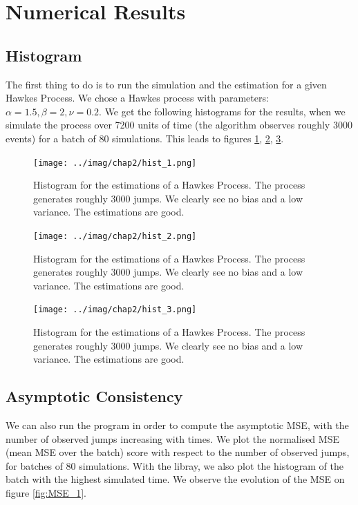 \documentclass[11pt]{book}
\begin{document}
\section{Numerical Results}


\subsection{Histogram}
The first thing to do is to run the simulation and the estimation for a given Hawkes Process. We chose a Hawkes process with parameters: $\alpha = 1.5, \beta = 2, \nu = 0.2$. We get the following histograms for the results, when we simulate the process over 7200 units of time (the algorithm observes roughly 3000 events) for a batch of 80 simulations. This leads to figures \ref{fig:hist_1_alpha}, \ref{fig:hist_1_beta}, \ref{fig:hist_1_nu}.

\begin{figure}
\centering
\texttt{[image: ../imag/chap2/hist\_1.png]}
\caption{Histogram for the estimations of a Hawkes Process. The process generates roughly 3000 jumps. We clearly see no bias and a low variance. The estimations are good.}
\label{fig:hist_1_alpha}
\end{figure}


\begin{figure}
\centering
\texttt{[image: ../imag/chap2/hist\_2.png]}
\caption{Histogram for the estimations of a Hawkes Process. The process generates roughly 3000 jumps. We clearly see no bias and a low variance. The estimations are good.}
\label{fig:hist_1_beta}
\end{figure}


\begin{figure}
\centering
\texttt{[image: ../imag/chap2/hist\_3.png]}
\caption{Histogram for the estimations of a Hawkes Process. The process generates roughly 3000 jumps. We clearly see no bias and a low variance. The estimations are good.}
\label{fig:hist_1_nu}
\end{figure}


\subsection{Asymptotic Consistency}

We can also run the program in order to compute the asymptotic MSE, with the number of observed jumps increasing with times. We plot the normalised MSE (mean MSE over the batch) score with respect to the number of observed jumps, for batches of 80 simulations. With the libray, we also plot the histogram of the batch with the highest simulated time. We observe the evolution of the MSE on figure \ref{fig:MSE_1}.
\end{document}

